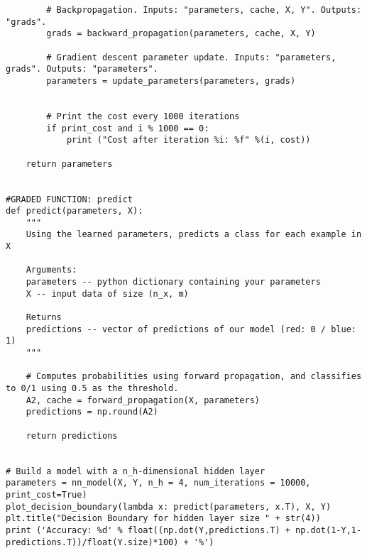 \begin{verbatim}
        # Backpropagation. Inputs: "parameters, cache, X, Y". Outputs: "grads".
        grads = backward_propagation(parameters, cache, X, Y)
 
        # Gradient descent parameter update. Inputs: "parameters, grads". Outputs: "parameters".
        parameters = update_parameters(parameters, grads)
        
        
        # Print the cost every 1000 iterations
        if print_cost and i % 1000 == 0:
            print ("Cost after iteration %i: %f" %(i, cost))

    return parameters


#GRADED FUNCTION: predict
def predict(parameters, X):
    """
    Using the learned parameters, predicts a class for each example in X
    
    Arguments:
    parameters -- python dictionary containing your parameters 
    X -- input data of size (n_x, m)
    
    Returns
    predictions -- vector of predictions of our model (red: 0 / blue: 1)
    """
    
    # Computes probabilities using forward propagation, and classifies to 0/1 using 0.5 as the threshold.
    A2, cache = forward_propagation(X, parameters)
    predictions = np.round(A2)
    
    return predictions


# Build a model with a n_h-dimensional hidden layer
parameters = nn_model(X, Y, n_h = 4, num_iterations = 10000, print_cost=True)
plot_decision_boundary(lambda x: predict(parameters, x.T), X, Y)
plt.title("Decision Boundary for hidden layer size " + str(4))
print ('Accuracy: %d' % float((np.dot(Y,predictions.T) + np.dot(1-Y,1-predictions.T))/float(Y.size)*100) + '%')
\end{verbatim}


\clearpage